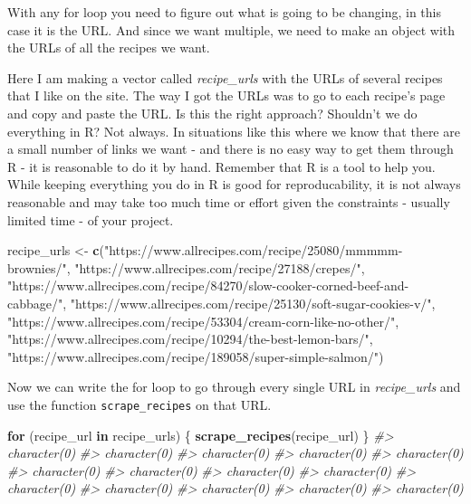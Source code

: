 \documentclass[
  12pt,
]{book}
\newenvironment{Shaded}{\begin{snugshade}}{\end{snugshade}}
\newcommand{\CommentTok}[1]{\textcolor[rgb]{0.56,0.35,0.01}{\textit{#1}}}
\newcommand{\ControlFlowTok}[1]{\textcolor[rgb]{0.13,0.29,0.53}{\textbf{#1}}}
\newcommand{\KeywordTok}[1]{\textcolor[rgb]{0.13,0.29,0.53}{\textbf{#1}}}
\newcommand{\NormalTok}[1]{#1}
\newcommand{\StringTok}[1]{\textcolor[rgb]{0.31,0.60,0.02}{#1}}
\begin{document}
With any for loop you need to figure out what is going to be changing, in this case it is the URL. And since we want multiple, we need to make an object with the URLs of all the recipes we want.

Here I am making a vector called \emph{recipe\_urls} with the URLs of several recipes that I like on the site. The way I got the URLs was to go to each recipe's page and copy and paste the URL. Is this the right approach? Shouldn't we do everything in R? Not always. In situations like this where we know that there are a small number of links we want - and there is no easy way to get them through R - it is reasonable to do it by hand. Remember that R is a tool to help you. While keeping everything you do in R is good for reproducability, it is not always reasonable and may take too much time or effort given the constraints - usually limited time - of your project.

\begin{Shaded}
\begin{Highlighting}[]
\NormalTok{recipe\_urls <{-}}\StringTok{ }\KeywordTok{c}\NormalTok{(}\StringTok{"https://www.allrecipes.com/recipe/25080/mmmmm{-}brownies/"}\NormalTok{,}
                 \StringTok{"https://www.allrecipes.com/recipe/27188/crepes/"}\NormalTok{,}
                 \StringTok{"https://www.allrecipes.com/recipe/84270/slow{-}cooker{-}corned{-}beef{-}and{-}cabbage/"}\NormalTok{,}
                 \StringTok{"https://www.allrecipes.com/recipe/25130/soft{-}sugar{-}cookies{-}v/"}\NormalTok{,}
                 \StringTok{"https://www.allrecipes.com/recipe/53304/cream{-}corn{-}like{-}no{-}other/"}\NormalTok{,}
                 \StringTok{"https://www.allrecipes.com/recipe/10294/the{-}best{-}lemon{-}bars/"}\NormalTok{,}
                 \StringTok{"https://www.allrecipes.com/recipe/189058/super{-}simple{-}salmon/"}\NormalTok{)}
\end{Highlighting}
\end{Shaded}

Now we can write the for loop to go through every single URL in \emph{recipe\_urls} and use the function \texttt{scrape\_recipes} on that URL.

\begin{Shaded}
\begin{Highlighting}[]
\ControlFlowTok{for}\NormalTok{ (recipe\_url }\ControlFlowTok{in}\NormalTok{ recipe\_urls) \{}
  \KeywordTok{scrape\_recipes}\NormalTok{(recipe\_url)}
\NormalTok{\}}
\CommentTok{\#> character(0)}
\CommentTok{\#> character(0)}
\CommentTok{\#> character(0)}
\CommentTok{\#> character(0)}
\CommentTok{\#> character(0)}
\CommentTok{\#> character(0)}
\CommentTok{\#> character(0)}
\CommentTok{\#> character(0)}
\CommentTok{\#> character(0)}
\CommentTok{\#> character(0)}
\CommentTok{\#> character(0)}
\CommentTok{\#> character(0)}
\CommentTok{\#> character(0)}
\CommentTok{\#> character(0)}
\end{Highlighting}
\end{Shaded}
\end{document}
